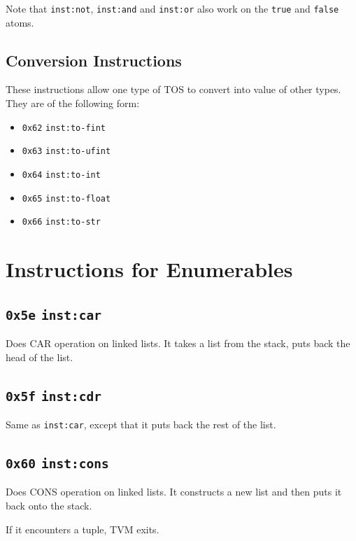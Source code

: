 \documentclass{report}
\newcommand{\inst}[1] {\texttt{inst:#1}}
\begin{document}
Note that \inst{not}, \inst{and} and \inst{or} also work on the \texttt{true} and \texttt{false} atoms.

\subsection{Conversion Instructions}

These instructions allow one type of TOS to convert into value of other types. They are of the following form:
\begin{itemize}
\item \texttt{0x62} \inst{to-fint} 
\item \texttt{0x63} \inst{to-ufint} 
\item \texttt{0x64} \inst{to-int} 
\item \texttt{0x65} \inst{to-float} 
\item \texttt{0x66} \inst{to-str} 
\end{itemize}

\section{Instructions for Enumerables}

\subsection{\texttt{0x5e} \inst{car} }

Does CAR operation on linked lists. It takes a list from the stack, puts back the head of the list.

\subsection{\texttt{0x5f} \inst{cdr} }

Same as \inst{car}, except that it puts back the rest of the list.

\subsection{\texttt{0x60} \inst{cons}  }

Does CONS operation on linked lists. It constructs a new list and then puts it back onto the stack.

\begin{mdframed}[style=hint]
  If it encounters a tuple, TVM exits.
\end{mdframed}
\end{document}

